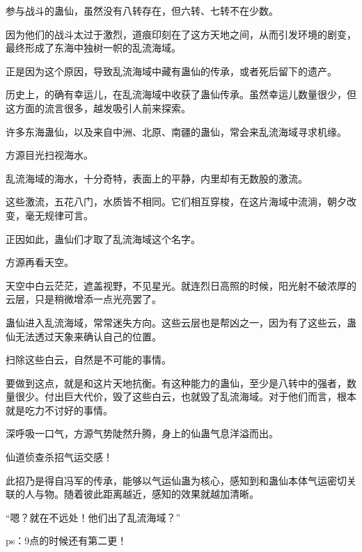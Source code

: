 \begin{this_body}
参与战斗的蛊仙，虽然没有八转存在，但六转、七转不在少数。

因为他们的战斗太过于激烈，道痕印刻在了这方天地之间，从而引发环境的剧变，最终形成了东海中独树一帜的乱流海域。

正是因为这个原因，导致乱流海域中藏有蛊仙的传承，或者死后留下的遗产。

历史上，的确有幸运儿，在乱流海域中收获了蛊仙传承。虽然幸运儿数量很少，但这方面的流言很多，越发吸引人前来探索。

许多东海蛊仙，以及来自中洲、北原、南疆的蛊仙，常会来乱流海域寻求机缘。

方源目光扫视海水。

乱流海域的海水，十分奇特，表面上的平静，内里却有无数股的激流。

这些激流，五花八门，水质皆不相同。它们相互穿梭，在这片海域中流淌，朝夕改变，毫无规律可言。

正因如此，蛊仙们才取了乱流海域这个名字。

方源再看天空。

天空中白云茫茫，遮盖视野，不见星光。就连烈日高照的时候，阳光射不破浓厚的云层，只是稍微增添一点光亮罢了。

蛊仙进入乱流海域，常常迷失方向。这些云层也是帮凶之一，因为有了这些云，蛊仙无法透过天象来确认自己的位置。

扫除这些白云，自然是不可能的事情。

要做到这点，就是和这片天地抗衡。有这种能力的蛊仙，至少是八转中的强者，数量很少。付出巨大代价，毁了这些白云，也就毁了乱流海域。对于他们而言，根本就是吃力不讨好的事情。

深呼吸一口气，方源气势陡然升腾，身上的仙蛊气息洋溢而出。

仙道侦查杀招气运交感！

此招乃是得自冯军的传承，能够以气运仙蛊为核心，感知到和蛊仙本体气运密切关联的人与物。随着彼此距离越近，感知的效果就越加清晰。

“嗯？就在不远处！他们出了乱流海域？”

ps：9点的时候还有第二更！

\end{this_body}

